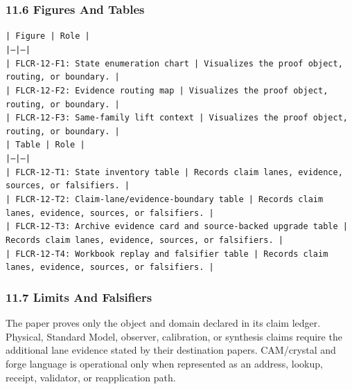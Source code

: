 \documentclass[11pt]{article}
\begin{document}
\subsubsection*{11.6 Figures And Tables}

\noindent\texttt{| Figure | Role |}\\
\noindent\texttt{|---|---|}\\
\noindent\texttt{| FLCR-12-F1: State enumeration chart | Visualizes the proof object, routing, or boundary. |}\\
\noindent\texttt{| FLCR-12-F2: Evidence routing map | Visualizes the proof object, routing, or boundary. |}\\
\noindent\texttt{| FLCR-12-F3: Same-family lift context | Visualizes the proof object, routing, or boundary. |}\\

\noindent\texttt{| Table | Role |}\\
\noindent\texttt{|---|---|}\\
\noindent\texttt{| FLCR-12-T1: State inventory table | Records claim lanes, evidence, sources, or falsifiers. |}\\
\noindent\texttt{| FLCR-12-T2: Claim-lane/evidence-boundary table | Records claim lanes, evidence, sources, or falsifiers. |}\\
\noindent\texttt{| FLCR-12-T3: Archive evidence card and source-backed upgrade table | Records claim lanes, evidence, sources, or falsifiers. |}\\
\noindent\texttt{| FLCR-12-T4: Workbook replay and falsifier table | Records claim lanes, evidence, sources, or falsifiers. |}\\

\subsubsection*{11.7 Limits And Falsifiers}

The paper proves only the object and domain declared in its claim ledger.
Physical, Standard Model, observer, calibration, or synthesis claims require
the additional lane evidence stated by their destination papers. CAM/crystal
and forge language is operational only when represented as an address, lookup,
receipt, validator, or reapplication path.
\end{document}
